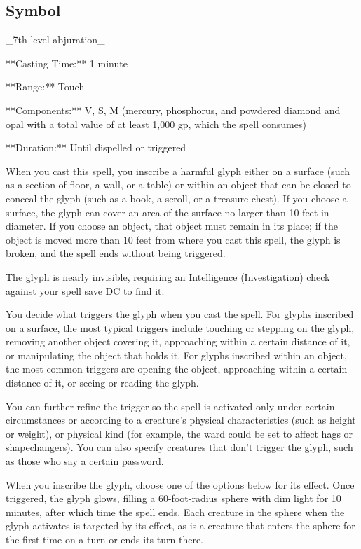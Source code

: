 \subsection{Symbol}

_7th-level abjuration_

**Casting Time:** 1 minute

**Range:** Touch

**Components:** V, S, M (mercury, phosphorus, and powdered diamond and opal with a total value of at least 1,000 gp, which the spell consumes)

**Duration:** Until dispelled or triggered

When you cast this spell, you inscribe a harmful glyph either on a surface (such as a section of floor, a wall, or a table) or within an object that can be closed to conceal the glyph (such as a book, a scroll, or a treasure chest). If you choose a surface, the glyph can cover an area of the surface no larger than 10 feet in diameter. If you choose an object, that object must remain in its place; if the object is moved more than 10 feet from where you cast this spell, the glyph is broken, and the spell ends without being triggered.

The glyph is nearly invisible, requiring an Intelligence (Investigation) check against your spell save DC to find it.

You decide what triggers the glyph when you cast the spell. For glyphs inscribed on a surface, the most typical triggers include touching or stepping on the glyph, removing another object covering it, approaching within a certain distance of it, or manipulating the object that holds it. For glyphs inscribed within an object, the most common triggers are opening the object, approaching within a certain distance of it, or seeing or reading the glyph.

You can further refine the trigger so the spell is activated only under certain circumstances or according to a creature’s physical characteristics (such as height or weight), or physical kind (for example, the ward could be set to affect hags or shapechangers). You can also specify creatures that don’t trigger the glyph, such as those who say a certain password.

When you inscribe the glyph, choose one of the options below for its effect. Once triggered, the glyph glows, filling a 60-foot-radius sphere with dim light for 10 minutes, after which time the spell ends. Each creature in the sphere when the glyph activates is targeted by its effect, as is a creature that enters the sphere for the first time on a turn or ends its turn there.


